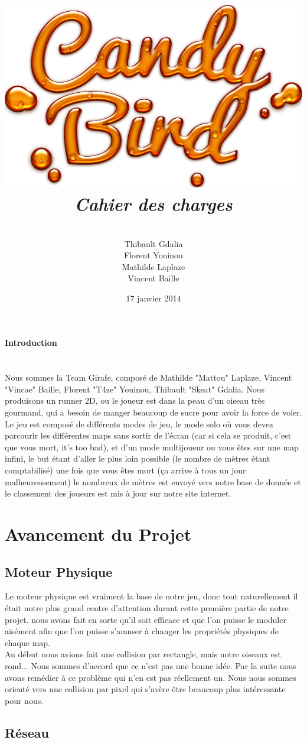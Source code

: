 \documentclass [11pt]{report}
\title{
	\includegraphics[scale=0.43]{images/Logojeu.png}
	 \\\vspace{20mm}
	\textbf{\Huge \itshape Cahier des charges }
	}
\author{ \\\vspace{2mm}
	Thibault Gdalia\\\vspace{2mm}
	Florent Youinou\\\vspace{2mm}
	Mathilde Laplaze\\\vspace{2mm}
	Vincent Baille \\\vspace{30mm}
	}
\date{17 janvier 2014}
\begin{document}
\renewcommand{\baselinestretch}{0.001}
\maketitle
\tableofcontents

\newpage


\textbf{{\Huge Introduction}}\\
\\
\\
\indent Nous sommes la Team Girafe, composé de Mathilde "Mattou" Laplaze, Vincent "Vincae" Baille, Florent "T4ze" Youinou, Thibault "Skeat" Gdalia. Nous produisons un runner 2D, ou le joueur est dans la peau d'un oiseau très gourmand, qui a besoin de manger beaucoup de sucre pour avoir la force de voler. Le jeu est composé de différents modes de jeu, le mode solo où vous devez parcourir les différentes maps sans sortir de l'écran (car si cela se produit, c'est que vous mort, it's too bad), et d'un mode multijoueur ou vous êtes sur une map infini, le but étant d'aller le plus loin possible (le nombre de mètres étant comptabilisé) une fois que vous êtes mort (ça arrive à tous un jour malheureusement) le nombreux de mètres est envoyé vers notre base de donnée et le classement des joueurs est mis à jour sur notre site internet.

\chapter{Avancement du Projet}
	\section{Moteur Physique}
		Le moteur physique est vraiment la base de notre jeu, donc tout naturellement il était notre plus grand centre d'attention durant cette première partie de notre projet. nous avons fait en sorte qu'il soit efficace et que l'on puisse le moduler aisément afin que l'on puisse s'amuser à changer les propriétés physiques de chaque map.\\
		\indent Au début nous avions fait une collision par rectangle, mais notre oiseaux est rond... Nous sommes d'accord que ce n'est pas une bonne idée. Par la suite nous avons remédier à ce problème qui n'en est pas réellement un. Nous nous sommes orienté vers une collision par pixel qui s'avère être beaucoup plus intéressante pour nous.
	\section{Réseau}
\end{document}
